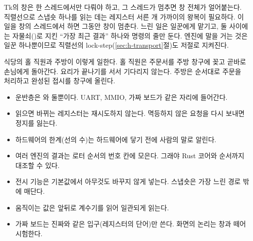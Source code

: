 \Why Tk의 창은 한 스레드에서만 다뤄야 하고, 그 스레드가 멈추면 창 전체가 얼어붙는다. 직렬선으로 스냅숏 하나를
읽는 데는 레지스터 서른 개 가까이의 왕복이 필요하다. 이 일을 창의 스레드에서 하면 그동안 창이 멈춘다. 느린 일은
일꾼에게 맡기고, 둘 사이에는 자물쇠()로 지킨 ``가장 최근 결과'' 하나와 명령의 줄만 둔다. 엔진에 말을
거는 것은 일꾼 하나뿐이므로 직렬선의 lock-step(\ref{sec:h-transport}절)도 저절로 지켜진다.

\General 식당의 홀 직원과 주방이 이렇게 일한다. 홀 직원은 주문서를 주방 창구에 꽂고 곧바로 손님에게 돌아간다.
요리가 끝나기를 서서 기다리지 않는다. 주방은 순서대로 주문을 처리하고 완성된 접시를 창구에 올린다.

\begin{keybox}[title={이 장의 정리}]
\begin{itemize}
\item 운반층은 와  둘뿐이다. UART, MMIO, 가짜 보드가 같은 자리에 들어간다.
\item 읽으면 바뀌는 레지스터는 재시도하지 않는다. 멱등하지 않은 요청을 다시 보내면 정지를 잃는다.
\item 하드웨어의 한계(선의 수)는 하드웨어에 닿기 전에 사람의 말로 알린다.
\item 여러 엔진의 결과는 로터 순서의 번호 칸에 모은다. 그래야 Rust 코어와 순서까지 대조할 수 있다.
\item 전시 기능은 기본값에서 아무것도 바꾸지 않게 넣는다. 스냅숏은 가장 느린 경로 밖에 매단다.
\item 움직이는 값은 앞뒤로 계수기를 읽어 일관되게 읽는다.
\item 가짜 보드는 진짜와 같은 입구(레지스터의 단어)만 쓴다. 화면의 논리는 창과 떼어 시험한다.
\end{itemize}
\end{keybox}
\endgroup
